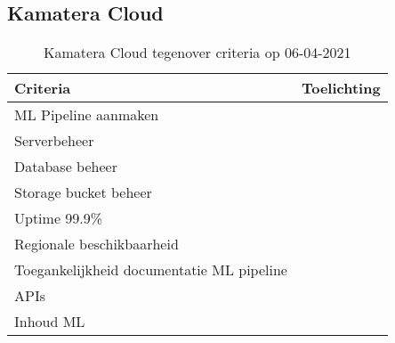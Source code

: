\subsection*{Kamatera Cloud}\label{appendix:detailed-overview-of-cloud-computing-platforms:katamara-cloud}
\begin{table}[hbt!]
  \centering
  \begin{tabular}{|p{.2\linewidth}|p{.74\linewidth}|}
  \hline
  \textbf{Criteria} & \textbf{Toelichting} \\ \hline
    ML Pipeline \newline aanmaken
    &

    \\ \hline

    Serverbeheer
    &

    \\ \hline

    Database beheer
    &

    \\ \hline

    Storage \newline bucket beheer
    &

    \\ \hline

    Uptime 99.9\%
    &

    \\ \hline

    Regionale \newline beschikbaarheid
    &

    \\ \hline

    Toegankelijkheid documentatie ML pipeline
    &

    \\ \hline

    APIs
    &

    \\ \hline

    Inhoud ML
    &

    \\ \hline
  \end{tabular}
  \caption{Kamatera Cloud tegenover criteria op 06-04-2021}
  \label{table:kamatera-cloud-against-criteria}
\end{table}

\newpage

